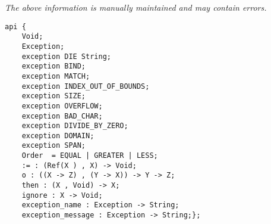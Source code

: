 \label{api:Exceptions}

{\tiny \it The above information is manually maintained and may contain errors.}
\begin{verbatim}
api {
    Void;
    Exception;
    exception DIE String;
    exception BIND;
    exception MATCH;
    exception INDEX_OUT_OF_BOUNDS;
    exception SIZE;
    exception OVERFLOW;
    exception BAD_CHAR;
    exception DIVIDE_BY_ZERO;
    exception DOMAIN;
    exception SPAN;
    Order  = EQUAL | GREATER | LESS;
    := : (Ref(X ) , X) -> Void;
    o : ((X -> Z) , (Y -> X)) -> Y -> Z;
    then : (X , Void) -> X;
    ignore : X -> Void;
    exception_name : Exception -> String;
    exception_message : Exception -> String;};
\end{verbatim}
\index[fun]{:=}
